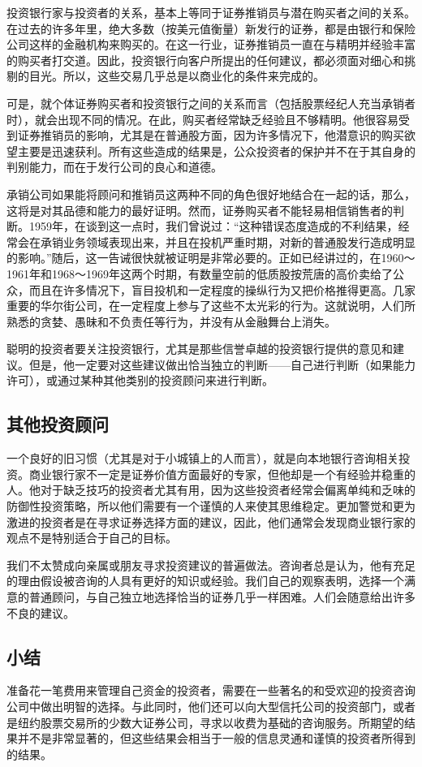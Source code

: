 \documentclass[12pt,oneside]{book}
\begin{document}
投资银行家与投资者的关系，基本上等同于证券推销员与潜在购买者之间的关系。在过去的许多年里，绝大多数（按美元值衡量）新发行的证券，都是由银行和保险公司这样的金融机构来购买的。在这一行业，证券推销员一直在与精明并经验丰富的购买者打交道。因此，投资银行向客户所提出的任何建议，都必须面对细心和挑剔的目光。所以，这些交易几乎总是以商业化的条件来完成的。

可是，就个体证券购买者和投资银行之间的关系而言（包括股票经纪人充当承销者时），就会出现不同的情况。在此，购买者经常缺乏经验且不够精明。他很容易受到证券推销员的影响，尤其是在普通股方面，因为许多情况下，他潜意识的购买欲望主要是迅速获利。所有这些造成的结果是，公众投资者的保护并不在于其自身的判别能力，而在于发行公司的良心和道德。

承销公司如果能将顾问和推销员这两种不同的角色很好地结合在一起的话，那么，这将是对其品德和能力的最好证明。然而，证券购买者不能轻易相信销售者的判断。1959年，在谈到这一点时，我们曾说过：“这种错误态度造成的不利结果，经常会在承销业务领域表现出来，并且在投机严重时期，对新的普通股发行造成明显的影响。”随后，这一告诫很快就被证明是非常必要的。正如已经讲过的，在1960～1961年和1968～1969年这两个时期，有数量空前的低质股按荒唐的高价卖给了公众，而且在许多情况下，盲目投机和一定程度的操纵行为又把价格推得更高。几家重要的华尔街公司，在一定程度上参与了这些不太光彩的行为。这就说明，人们所熟悉的贪婪、愚昧和不负责任等行为，并没有从金融舞台上消失。

聪明的投资者要关注投资银行，尤其是那些信誉卓越的投资银行提供的意见和建议。但是，他一定要对这些建议做出恰当独立的判断——自己进行判断（如果能力许可），或通过某种其他类别的投资顾问来进行判断。

\subsection{其他投资顾问}
一个良好的旧习惯（尤其是对于小城镇上的人而言），就是向本地银行咨询相关投资。商业银行家不一定是证券价值方面最好的专家，但他却是一个有经验并稳重的人。他对于缺乏技巧的投资者尤其有用，因为这些投资者经常会偏离单纯和乏味的防御性投资策略，所以他们需要有一个谨慎的人来使其思维稳定。更加警觉和更为激进的投资者是在寻求证券选择方面的建议，因此，他们通常会发现商业银行家的观点不是特别适合于自己的目标。

我们不太赞成向亲属或朋友寻求投资建议的普遍做法。咨询者总是认为，他有充足的理由假设被咨询的人具有更好的知识或经验。我们自己的观察表明，选择一个满意的普通顾问，与自己独立地选择恰当的证券几乎一样困难。人们会随意给出许多不良的建议。

\subsection{小结}
准备花一笔费用来管理自己资金的投资者，需要在一些著名的和受欢迎的投资咨询公司中做出明智的选择。与此同时，他们还可以向大型信托公司的投资部门，或者是纽约股票交易所的少数大证券公司，寻求以收费为基础的咨询服务。所期望的结果并不是非常显著的，但这些结果会相当于一般的信息灵通和谨慎的投资者所得到的结果。
\end{document}

